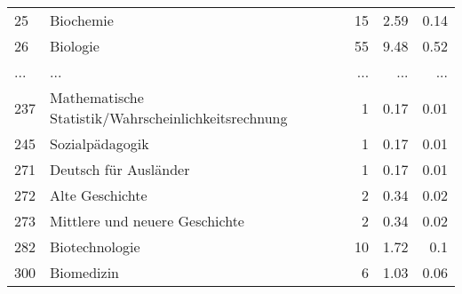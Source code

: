 \begin{longtable}{lXrrr}
        25 & \multicolumn{1}{X}{Biochemie} & %
          \num{15} &
          \num[round-mode=places,round-precision=2]{2,59} &
          \num[round-mode=places,round-precision=2]{0,14} \\
        26 & \multicolumn{1}{X}{Biologie} & %
          \num{55} &
          \num[round-mode=places,round-precision=2]{9,48} &
          \num[round-mode=places,round-precision=2]{0,52} \\
       ... & ... & ... & ... & ... \\
        237 & \multicolumn{1}{X}{Mathematische Statistik/Wahrscheinlichkeitsrechnung} & %
          \num{1} &
          \num[round-mode=places,round-precision=2]{0,17} &
          \num[round-mode=places,round-precision=2]{0,01} \\

        245 & \multicolumn{1}{X}{Sozialpädagogik} & %
          \num{1} &
          \num[round-mode=places,round-precision=2]{0,17} &
          \num[round-mode=places,round-precision=2]{0,01} \\

        271 & \multicolumn{1}{X}{Deutsch für Ausländer} & %
          \num{1} &
          \num[round-mode=places,round-precision=2]{0,17} &
          \num[round-mode=places,round-precision=2]{0,01} \\

        272 & \multicolumn{1}{X}{Alte Geschichte} & %
          \num{2} &
          \num[round-mode=places,round-precision=2]{0,34} &
          \num[round-mode=places,round-precision=2]{0,02} \\

        273 & \multicolumn{1}{X}{Mittlere und neuere Geschichte} & %
          \num{2} &
          \num[round-mode=places,round-precision=2]{0,34} &
          \num[round-mode=places,round-precision=2]{0,02} \\

        282 & \multicolumn{1}{X}{Biotechnologie} & %
          \num{10} &
          \num[round-mode=places,round-precision=2]{1,72} &
          \num[round-mode=places,round-precision=2]{0,1} \\

        300 & \multicolumn{1}{X}{Biomedizin} & %
          \num{6} &
          \num[round-mode=places,round-precision=2]{1,03} &
          \num[round-mode=places,round-precision=2]{0,06} \\


\end{longtable}
